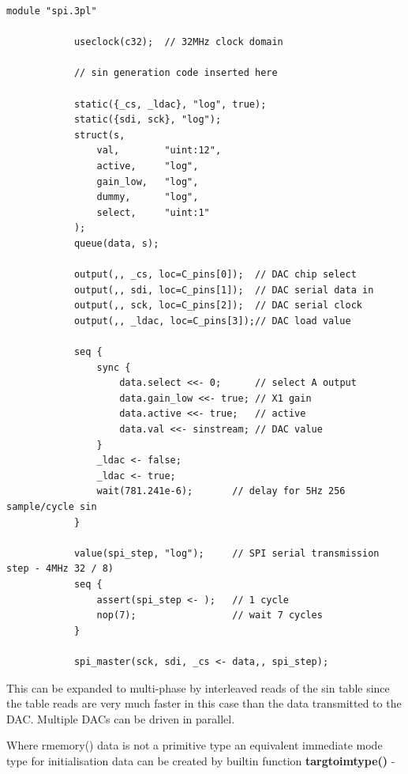         \begin{lstlisting}[gobble=8, language=threepl]
            module "spi.3pl"

            useclock(c32);  // 32MHz clock domain

            // sin generation code inserted here

            static({_cs, _ldac}, "log", true);
            static({sdi, sck}, "log");
            struct(s,
                val,        "uint:12",
                active,     "log",
                gain_low,   "log",
                dummy,      "log",
                select,     "uint:1"
            );
            queue(data, s);

            output(,, _cs, loc=C_pins[0]);  // DAC chip select
            output(,, sdi, loc=C_pins[1]);  // DAC serial data in
            output(,, sck, loc=C_pins[2]);  // DAC serial clock
            output(,, _ldac, loc=C_pins[3]);// DAC load value

            seq {
                sync {
                    data.select <<- 0;      // select A output
                    data.gain_low <<- true; // X1 gain
                    data.active <<- true;   // active
                    data.val <<- sinstream; // DAC value
                }
                _ldac <- false;
                _ldac <- true;
                wait(781.241e-6);       // delay for 5Hz 256 sample/cycle sin
            }

            value(spi_step, "log");     // SPI serial transmission step - 4MHz 32 / 8)
            seq {
                assert(spi_step <- );   // 1 cycle
                nop(7);                 // wait 7 cycles
            }

            spi_master(sck, sdi, _cs <- data,, spi_step);
        \end{lstlisting}
        
        This can be expanded to multi-phase by interleaved reads of the sin
        table since the table reads are very much faster in this case than
        the data transmitted to the DAC. Multiple DACs can be driven in parallel.

        Where rmemory() data is not a primitive type an equivalent immediate
        mode type for initialisation data can be created by builtin function
        {\bf targtoimtype()}  -

